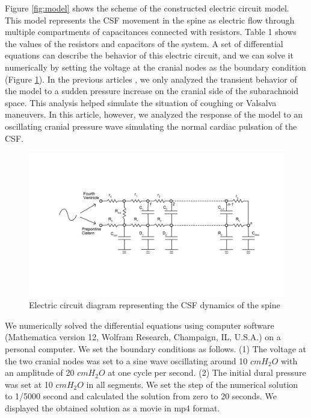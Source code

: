 \documentclass[fleqn,10pt]{wlscirep}
\begin{document}
Figure \ref{fig:model} shows the scheme of the constructed electric circuit
model. This model represents the CSF movement in the spine as electric flow
through multiple compartments of capacitances connected with resistors.
Table 1 shows the values of the resistors and capacitors of the system. A
set of differential equations can describe the behavior of this electric
circuit, and we can solve it numerically by setting the voltage at the
cranial nodes as the boundary condition (Figure \ref{fig:circuit}). In the
previous articles \cite{chang2003hypothesis, chang2004theoretical}, we only
analyzed the transient behavior of the model to a sudden pressure increase
on the cranial side of the subarachnoid space. This analysis helped
simulate the situation of coughing or Valsalva maneuvers. In this article,
however, we analyzed the response of the model to an oscillating cranial
pressure wave simulating the normal cardiac pulsation of the CSF.

\begin{figure}[ht]
    \centering
    \includegraphics[width=\textwidth]{electric_circuit_new.jpg}
    \caption{Electric circuit diagram representing the CSF dynamics of the spine}
    \label{fig:circuit}
\end{figure}

We numerically solved the differential equations using computer software
(Mathematica version 12, Wolfram Research, Champaign, IL, U.S.A.) on a
personal computer. We set the boundary conditions as follows. (1) The
voltage at the two cranial nodes was set to a sine wave oscillating around
10 $cmH_{2}O$ with an amplitude of 20 $cmH_{2}O$ at one cycle per second.
(2) The initial dural pressure was set at 10 $cmH_{2}O$ in all segments. We
set the step of the numerical solution to 1/5000 second and calculated the
solution from zero to 20 seconds. We displayed the obtained solution as a
movie in mp4 format.
\end{document}
